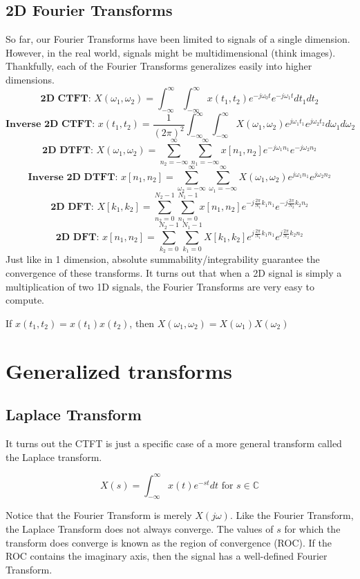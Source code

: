 \subsection{2D Fourier Transforms}
So far, our Fourier Transforms have been limited to signals of a single dimension. However, in the real world, signals might be multidimensional (think images).
Thankfully, each of the Fourier Transforms generalizes easily into higher dimensions.\\
\[
\textbf{2D CTFT: }X(\omega_1, \omega_2) = \int_{-\infty}^{\infty}\int_{-\infty}^{\infty}{x(t_1, t_2)e^{-j\omega_0t}e^{-j\omega_1t}dt_1dt_2}
\]
\[
\textbf{Inverse 2D CTFT: }x(t_1, t_2) = \frac{1}{(2\pi)^2}\int_{-\infty}^{\infty}\int_{-\infty}^{\infty}{X(\omega_1, \omega_2)e^{j\omega_1t_1}e^{j\omega_2t_2}d\omega_1d\omega_2}
\]
\[
\textbf{2D DTFT: }X(\omega_1, \omega_2) = \sum_{n_2=-\infty}^{\infty}\sum_{n_1=-\infty}^{\infty}{x[n_1,n_2]e^{-j\omega_1n_1}e^{-j\omega_2n_2}}
\]
\[
\textbf{Inverse 2D DTFT: }x[n_1, n_2] = \sum_{\omega_2=-\infty}^{\infty}\sum_{\omega_1=-\infty}^{\infty}{X(\omega_1,\omega_2)e^{j\omega_1n_1}e^{j\omega_2n_2}}
\]
\[
\textbf{2D DFT: }X[k_1, k_2] = \sum_{n_2=0}^{N_2-1}\sum_{n_1=0}^{N_1-1}{x[n_1, n_2]e^{-j\frac{2\pi}{N_1}k_1 n_1}e^{-j\frac{2\pi}{N_2}k_2 n_2}}
\]
\[
\textbf{2D DFT: }x[n_1, n_2] = \sum_{k_2=0}^{N_2-1}\sum_{k_1=0}^{N_1-1}{X[k_1, k_2]e^{j\frac{2\pi}{N_1}k_1 n_1}e^{j\frac{2\pi}{N_2}k_2 n_2}}
\]
Just like in 1 dimension, absolute summability/integrability guarantee the convergence of these transforms.
It turns out that when a 2D signal is simply a multiplication of two 1D signals, the Fourier Transforms are very easy to compute.
\begin{theorem}
    If $x(t_1, t_2) = x(t_1)x(t_2)$, then $X(\omega_1, \omega_2) = X(\omega_1)X(\omega_2)$
\end{theorem}
\section{Generalized transforms}
\subsection{Laplace Transform}
It turns out the CTFT  is just a specific case of a more general transform called the Laplace transform.
\begin{definition}
    \[
X(s) = \int_{-\infty}^{\infty}{x(t)e^{-st}dt} \text { for } s\in\mathbb{C}
\]
\end{definition}
Notice that the Fourier Transform is merely $X(j\omega)$. Like the Fourier Transform, the Laplace Transform does not always converge.
The values of $s$ for which the transform does converge is known as the region of convergence (ROC). If the ROC contains the imaginary axis,
then the signal has a well-defined Fourier Transform. 

